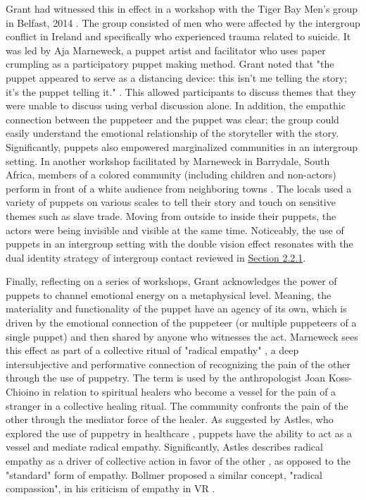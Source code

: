 \documentclass[dissertation,math,vertlayout,pdfa,colorlinks]{aaltoseries}
\begin{document}
Grant had witnessed this in effect in a workshop with the Tiger Bay Men's group in Belfast, 2014 \cite[p. 5]{grantObjectsObjectivesApplied2020}. The group consisted of men who were affected by the intergroup conflict in Ireland and specifically who experienced trauma related to suicide. It was led by Aja Marneweck, a puppet artist and facilitator who uses paper crumpling as a participatory puppet making method. Grant noted that "the puppet appeared to serve as a distancing device: this isn’t me telling the story; it’s the puppet telling it." \cite[p. 5]{grantObjectsObjectivesApplied2020}. This allowed participants to discuss themes that they were unable to discuss using verbal discussion alone. In addition, the empathic connection between the puppeteer and the puppet was clear; the group could easily understand the emotional relationship of the storyteller with the story. Significantly, puppets also empowered marginalized communities in an intergroup setting. In another workshop facilitated by Marneweck in Barrydale, South Africa, members of a colored community (including children and non-actors) perform in front of a white audience from neighboring towns \cite[p. 6]{grantObjectsObjectivesApplied2020}. The locals used a variety of puppets on various scales to tell their story and touch on sensitive themes such as slave trade. Moving from outside to inside their puppets, the actors were being invisible and visible at the same time. Noticeably, the use of puppets in an intergroup setting with the double vision effect resonates with the dual identity strategy of intergroup contact reviewed in \hyperref[sec:dual_identity]{Section 2.2.1}. 

Finally, reflecting on a series of workshops, Grant acknowledges the power of puppets to channel emotional energy on a metaphysical level. Meaning, the materiality and functionality of the puppet have an agency of its own, which is driven by the emotional connection of the puppeteer (or multiple puppeteers of a single puppet) and then shared by anyone who witnesses the act. Marneweck sees this effect as part of a collective ritual of "radical empathy" \cite{marneweck2016a}, a deep intersubjective and performative connection of recognizing the pain of the other through the use of puppetry. The term is used by the anthropologist Joan Koss-Chioino \cite{koss-chioinoSpiritualTransformationRelation2006} in relation to spiritual healers who become a vessel for the pain of a stranger in a collective healing ritual. The community confronts the pain of the other through the mediator force of the healer. As suggested by Astles, who explored the use of puppetry in healthcare \cite{astlesWalkWalkMy2020}, puppets have the ability to act as a vessel and mediate radical empathy. Significantly, Astles describes radical empathy as a driver of collective action in favor of the other \cite{astlesWalkWalkMy2020}, as opposed to the "standard" form of empathy. Bollmer proposed a similar concept, "radical compassion", in his criticism of empathy in VR \cite{bollmerEmpathyMachines2017}.  
\end{document}
